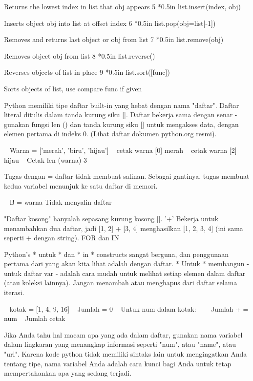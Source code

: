 Returns the lowest index in list that obj appears 
5 *{0.5in} list.insert(index, obj) 

Inserts object obj into list at offset index 
6 *{0.5in} list.pop(obj=list[-1]) 

Removes and returns last object or obj from list 
7 *{0.5in} list.remove(obj) 

Removes object obj from list 
8 *{0.5in} list.reverse() 

Reverses objects of list in place 
9 *{0.5in} list.sort([func]) 

Sorts objects of list, use compare func if given 

Python memiliki tipe daftar built-in yang hebat dengan nama "daftar". Daftar literal ditulis dalam tanda kurung siku []. Daftar bekerja sama dengan senar - gunakan fungsi len () dan tanda kurung siku [] untuk mengakses data, dengan elemen pertama di indeks 0. (Lihat daftar dokumen python.org resmi). 

~ Warna = ['merah', 'biru', 'hijau'] 
~ cetak warna [0]            merah 
~ cetak warna [2]            hijau 
~ Cetak len (warna)            3 


  
Tugas dengan = daftar tidak membuat salinan. Sebagai gantinya, tugas membuat kedua variabel menunjuk ke satu daftar di memori. 

~ B = warna            Tidak menyalin daftar 
  
"Daftar kosong" hanyalah sepasang kurung kosong []. '+' Bekerja untuk menambahkan dua daftar, jadi [1, 2] + [3, 4] menghasilkan [1, 2, 3, 4] (ini sama seperti + dengan string). 
FOR dan IN 

Python's * untuk * dan * in * constructs sangat berguna, dan penggunaan pertama dari yang akan kita lihat adalah dengan daftar. * Untuk * membangun - untuk daftar var - adalah cara mudah untuk melihat setiap elemen dalam daftar (atau koleksi lainnya). Jangan menambah atau menghapus dari daftar selama iterasi. 

~ kotak = [1, 4, 9, 16] 
~ Jumlah = 0 
~ Untuk num dalam kotak: 
~~~ Jumlah + = num 
~ Jumlah cetak 

Jika Anda tahu hal macam apa yang ada dalam daftar, gunakan nama variabel dalam lingkaran yang menangkap informasi seperti "num", atau "name", atau "url". Karena kode python tidak memiliki sintaks lain untuk mengingatkan Anda tentang tipe, nama variabel Anda adalah cara kunci bagi Anda untuk tetap mempertahankan apa yang sedang terjadi. 

